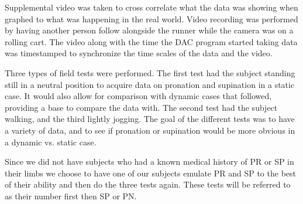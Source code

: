 Supplemental video was taken to cross correlate what the data was showing when graphed to what was happening in the real world.
Video recording was performed by having another person follow alongside the runner while the camera was on a rolling cart.
The video along with the time the DAC program started taking data was timestamped to synchronize the time scales of the data and the video.\par

Three types of field tests were performed.
The first test had the subject standing still in a neutral position to acquire data on pronation and supination in a static case.
It would also allow for comparison with dynamic cases that followed, providing a base to compare the data with.
The second test had the subject walking, and the third lightly jogging.
The goal of the different tests was to have a variety of data, and to see if pronation or supination would be more obvious in a dynamic vs. static case.\par

Since we did not have subjects who had a known medical history of PR or SP in their limbs we choose to have one of our subjects emulate PR and SP to the best of their ability and then do the three tests again.
These tests will be referred to as their number first then SP or PN.
